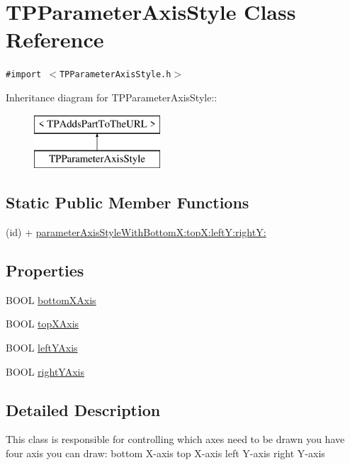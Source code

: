 \hypertarget{interface_t_p_parameter_axis_style}{
\section{TPParameterAxisStyle Class Reference}
\label{interface_t_p_parameter_axis_style}
}
{\tt \#import $<$TPParameterAxisStyle.h$>$}

Inheritance diagram for TPParameterAxisStyle::\begin{figure}[H]
\begin{center}
\leavevmode
\includegraphics[height=2cm]{interface_t_p_parameter_axis_style}
\end{center}
\end{figure}
\subsection*{Static Public Member Functions}
\begin{CompactItemize}
\item 
(id) + \hyperlink{interface_t_p_parameter_axis_style_ef15fbeffb6002dde5c1128b020cb921}{parameterAxisStyleWithBottomX:topX:leftY:rightY:}
\end{CompactItemize}
\subsection*{Properties}
\begin{CompactItemize}
\item 
BOOL \hyperlink{interface_t_p_parameter_axis_style_32960050862b00747067ff4e0a665025}{bottomXAxis}
\item 
BOOL \hyperlink{interface_t_p_parameter_axis_style_023f3d06469c12184a8e87cca3a75a02}{topXAxis}
\item 
BOOL \hyperlink{interface_t_p_parameter_axis_style_78a223caf4b42242604f27c1506d25ec}{leftYAxis}
\item 
BOOL \hyperlink{interface_t_p_parameter_axis_style_1e8f22695a7b7ddb29e6355c6533d7bd}{rightYAxis}
\end{CompactItemize}


\subsection{Detailed Description}
This class is responsible for controlling which axes need to be drawn you have four axis you can draw: bottom X-axis top X-axis left Y-axis right Y-axis 

